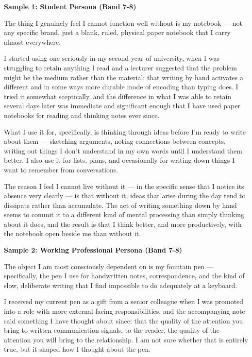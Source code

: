 \begin{ieltsanswer}
\textbf{Sample 1: Student Persona (Band 7-8)}

The thing I genuinely feel I cannot function well without is my notebook — not any specific brand, just a blank, ruled, physical paper notebook that I carry almost everywhere.

I started using one seriously in my second year of university, when I was struggling to retain anything I read and a lecturer suggested that the problem might be the medium rather than the material: that writing by hand activates a different and in some ways more durable mode of encoding than typing does. I tried it somewhat sceptically, and the difference in what I was able to retain several days later was immediate and significant enough that I have used paper notebooks for reading and thinking notes ever since.

What I use it for, specifically, is thinking through ideas before I'm ready to write about them — sketching arguments, noting connections between concepts, writing out things I don't understand in my own words until I understand them better. I also use it for lists, plans, and occasionally for writing down things I want to remember from conversations.

The reason I feel I cannot live without it — in the specific sense that I notice its absence very clearly — is that without it, ideas that arise during the day tend to dissipate rather than accumulate. The act of writing something down by hand seems to commit it to a different kind of mental processing than simply thinking about it does, and the result is that I think better, and more productively, with the notebook open beside me than without it.

\textbf{Sample 2: Working Professional Persona (Band 7-8)}

The object I am most consciously dependent on is my fountain pen — specifically, the pen I use for handwritten notes, correspondence, and the kind of slow, deliberate writing that I find impossible to do adequately at a keyboard.

I received my current pen as a gift from a senior colleague when I was promoted into a role with more external-facing responsibilities, and the accompanying note said something I have thought about since: that the quality of the attention you bring to written communication signals, to the reader, the quality of the attention you will bring to the relationship. I am not sure whether that is entirely true, but it shaped how I thought about the pen.


\end{ieltsanswer}
